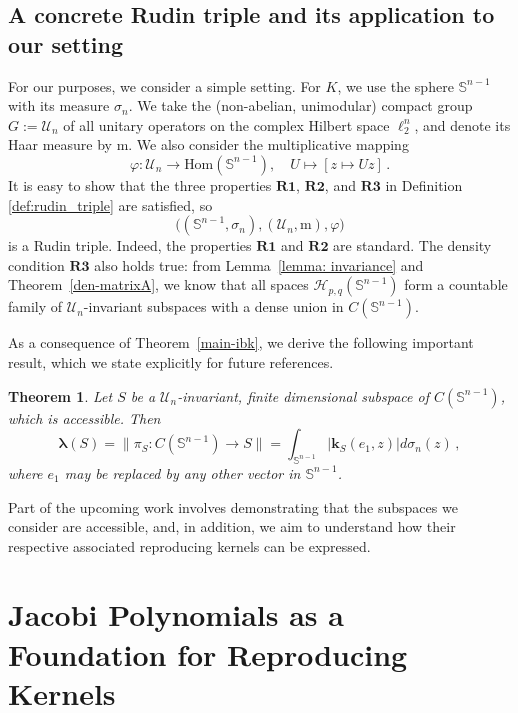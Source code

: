\documentclass[12pt]{amsart}
\numberwithin{subsection}{section}
\newtheorem{theorem}{Theorem}[section]
\theoremstyle{definition}
\theoremstyle{remark}
\begin{document}
\subsection{A concrete Rudin triple and its application to our setting} For our purposes, we consider a simple setting. For  $K $, we use the sphere  $\mathbb{S}^{n-1} $ with its  measure  $\sigma_n $. We take the (non-abelian, unimodular) compact group  $G := \mathcal{U}_n $ of all unitary operators on the complex Hilbert space  $\ell^n_2 $, and denote its Haar measure by  $\mathrm{m} $.  We also consider the multiplicative mapping
\[
\varphi \colon \mathcal{U}_n \to \text{Hom}(\mathbb{S}^{n-1}), \quad U \mapsto [z \mapsto Uz]\,.
\]
It is easy to show that the three properties  $\mathbf{R1} $,  $\mathbf{R2} $, and  $\mathbf{R3} $ in Definition \ref{def:rudin_triple} are satisfied, so  $$\big((\mathbb{S}^{n-1},\sigma_n),(\mathcal{U}_n,\mathrm{m}),\varphi\big)$$ is  a Rudin triple.
Indeed, the properties $ \mathbf{R1} $ and $ \mathbf{R2} $ are standard. The density condition $ \mathbf{R3} $ also holds true: from Lemma~\ref{lemma: invariance} and Theorem~\ref{den-matrixA}, we know that all spaces $ \mathcal{H}_{p,q}(\mathbb{S}^{n-1}) $ form a countable family of $ \mathcal{U}_n $-invariant subspaces with a dense union in $ C(\mathbb{S}^{n-1}) $.




As a consequence of Theorem~\ref{main-ibk}, we derive the following important result, which we state explicitly for future references.

\begin{theorem} \label{abstractS}
Let  $S $ be a  $\mathcal U_n $-invariant, finite dimensional  subspace of   $C(\mathbb{S}^{n-1}) $, which is accessible. Then
\[
\boldsymbol{\lambda}(S) =  \big\|\pi_{S} \colon C(\mathbb{S}^{n-1}) \to S\big\|=\int_{\mathbb{S}^{n-1} }\big|\mathbf{k}_S(e_1,z) \big| d\sigma_n (z)\,,
\]
where  $e_1 $ may be replaced by any other vector in  $\mathbb{S}^{n-1} $.
\end{theorem}


Part of the upcoming work involves demonstrating that the subspaces we consider are accessible, and, in addition, we aim to understand how their respective associated reproducing kernels can be expressed.

\bigskip




\section{Jacobi Polynomials as a Foundation for Reproducing Kernels}
\end{document}
